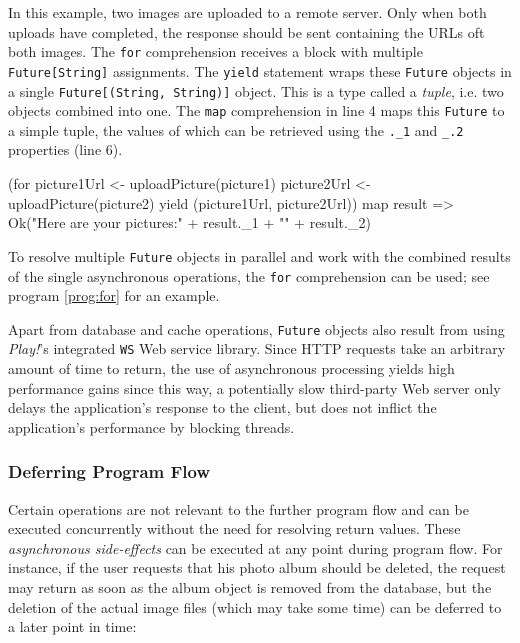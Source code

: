 \begin{program}
  \caption{In this example, two images are uploaded to a remote server. Only when both uploads have completed, the response should be sent containing the URLs oft both images. The \texttt{for} comprehension receives a block with multiple \texttt{Future[String]} assignments. The \texttt{yield} statement wraps these \texttt{Future} objects in a single \texttt{Future[(String, String)]} object. This is a type called a \textit{tuple}, i.e. two objects combined into one. The \texttt{map} comprehension in line 4 maps this \texttt{Future} to a simple tuple, the values of which can be retrieved using the \texttt{.\_1} and \texttt{\_.2} properties (line 6).}
  \label{prog:for}
\begin{JavaCode}
(for {
    picture1Url <- uploadPicture(picture1)
    picture2Url <- uploadPicture(picture2)
} yield (picture1Url, picture2Url)) map {
    result =>
        Ok("Here are your pictures:\n" + result._1 + "\n" + result._2)
}
\end{JavaCode}
\end{program}

To resolve multiple \texttt{Future} objects in parallel and work with the combined results of the single asynchronous operations, the \texttt{for} comprehension can be used; see program \ref{prog:for} for an example.

Apart from database and cache operations, \texttt{Future} objects also result from using \textit{Play!}'s integrated \texttt{WS} Web service library. Since HTTP requests take an arbitrary amount of time to return, the use of asynchronous processing yields high performance gains since this way, a potentially slow third-party Web server only delays the application's response to the client, but does not inflict the application's performance by blocking threads. 

\subsubsection*{Deferring Program Flow}
Certain operations are not relevant to the further program flow and can be executed concurrently without the need for resolving return values. These \textit{asynchronous side-effects} can be executed at any point during program flow. For instance, if the user requests that his photo album should be deleted, the request may return as soon as the album object is removed from the database, but the deletion of the actual image files (which may take some time) can be deferred to a later point in time:

